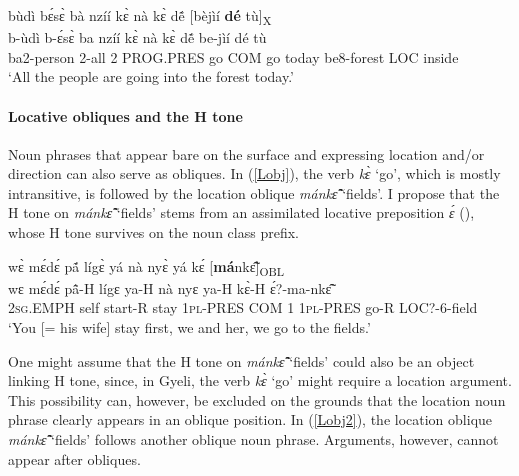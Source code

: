 \begin{exe} 
\ex\label{LOBL2} 
  \glll  bùdì bɛ́sɛ̀ bà nzíí kɛ̀ nà kɛ̀ dẽ́ [bèjìí {\bfseries dé} tù]\textsubscript{X} \\
       b-ùdì b-ɛ́sɛ̀ ba nzíí kɛ̀ nà kɛ̀ dẽ́ be-jìí dé tù \\
         ba2-person 2-all 2 PROG.PRES go COM go today be8-forest LOC inside   \\
    \trans `All the people are going into the forest today.'
\end{exe}


\paragraph{Locative obliques and the H tone}
Noun phrases that appear bare on the surface and expressing location and/or direction can also serve as obliques.%
In (\ref{Lobj}), the verb {\itshape kɛ̀} `go', which is mostly intransitive, is followed by the location oblique {\itshape mánkɛ̃̂} `fields'. I propose that the H tone on {\itshape mánkɛ̃̂} `fields' stems from an assimilated locative preposition {\itshape ɛ́} (), whose H tone survives on the noun class prefix.


\begin{exe} 
\ex\label{Lobj}
  \glll   wɛ̀ mɛ́dɛ́ pã́ lígɛ̀ yá nà nyɛ̀ yá kɛ́ [{\bfseries má}nkɛ̃̂]\textsubscript{OBL}  \\
         wɛ mɛ́dɛ́ pã̂-H lígɛ ya-H nà nyɛ ya-H kɛ̀-H ɛ́?-ma-nkɛ̃̂  \\
           2\textsc{sg}.EMPH self start-R stay 1\textsc{pl}-PRES COM 1  1\textsc{pl}-PRES go-R LOC?-6-field \\
    \trans `You [= his wife] stay first, we and her, we go to the fields.'
\end{exe}

One might assume that the H tone on {\itshape mánkɛ̂̃} `fields' could also be an object linking H tone, since, in Gyeli, the verb {\itshape kɛ̀} `go' might require a location argument. This possibility can, however, be excluded on the grounds that the location noun phrase clearly appears in an oblique position. In (\ref{Lobj2}), the location oblique {\itshape mánkɛ̃̂} `fields' follows another oblique noun phrase. Arguments, however, cannot appear after obliques.

